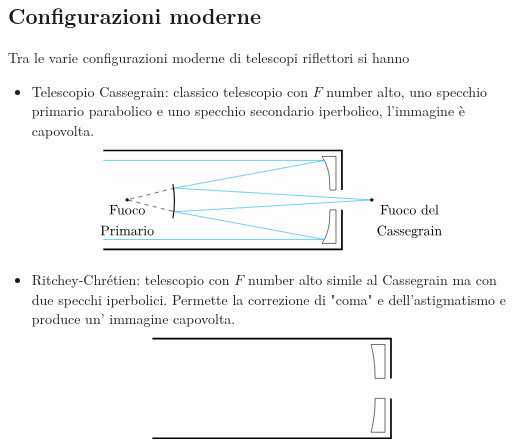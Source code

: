 \documentclass[a4paper, oneside]{book}
\begin{document}
\subsection{Configurazioni moderne}
Tra le varie configurazioni moderne di telescopi riflettori si hanno 
\begin{itemize}
    \item Telescopio Cassegrain: classico telescopio con $F$ number alto, uno specchio
    primario parabolico e uno specchio secondario iperbolico, l'immagine è capovolta.
    \begin{gather*}
        \begin{tikzpicture}
            \draw[very thick](0, 1.25) -- (6, 1.25) -- (6, 0.25);
            \draw[very thick](6, -0.25) -- (6, -1.25) -- (0, -1.25);
            \draw(5.5, 1.1) -- (5.85, 1.1) -- (5.85, 0.25) -- (5.7, 0.25);
            \draw(5.5, -1.1) -- (5.85, -1.1) -- (5.85, -0.25) -- (5.7, -0.25);
            \draw(5.5, 1.1) .. controls (5.75, 0.7) and (5.67, 0.4) .. (5.7, 0.25);
            \draw(5.5, -1.1) .. controls (5.75, -0.7) and (5.67, -0.4) .. (5.7, -0.25);
            \draw[cyan](0, 1) -- (5.55, 1) -- (1.8, 0.3) -- (6.75, 0);
            \draw[cyan](0, -1) -- (5.55, -1) -- (1.8, -0.3) -- (6.75, 0);
            \draw[thick] (1.75, 0.4) arc (10:-10:2.5);
            \filldraw[align = center] (6.75, 0) circle (1pt) node[anchor = north west] {Fuoco del \\ Cassegrain};
            \draw[dashed] (1.8, 0.3) -- (0.6, 0) -- (1.8, -0.3);
            \filldraw[align = center](0.6, 0) circle (1pt) node[anchor = north] {Fuoco \\ Primario};
        \end{tikzpicture}
    \end{gather*}
    \item Ritchey-Chrétien: telescopio con $F$ number alto simile al Cassegrain ma con due specchi iperbolici.
    Permette la correzione di "coma" e dell'astigmatismo e produce un'
    immagine capovolta. 
    \begin{gather*}
        \begin{tikzpicture}
            \draw[very thick](0, 1.25) -- (6, 1.25) -- (6, 0.25);
            \draw[very thick](6, -0.25) -- (6, -1.25) -- (0, -1.25);
            \draw(5.5, 1.1) -- (5.85, 1.1) -- (5.85, 0.25) -- (5.6, 0.25);
            \draw(5.5, -1.1) -- (5.85, -1.1) -- (5.85, -0.25) -- (5.6, -0.25);
            \draw(5.5, 1.1) .. controls (5.6, 0.7) and (5.6, 0.4) .. (5.6, 0.25);
            \draw(5.5, -1.1) .. controls (5.6, -0.7) and (5.6, -0.4) .. (5.6, -0.25);

\end{tikzpicture}
\end{gather*}
\end{itemize}
\end{document}
